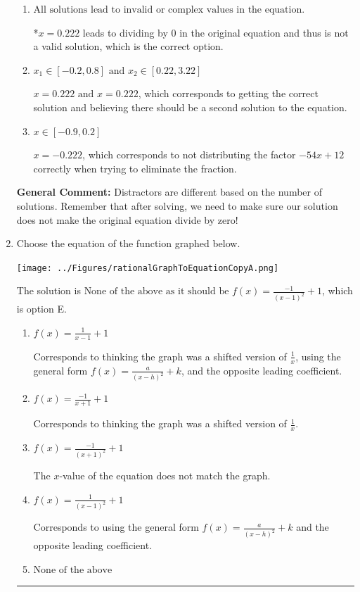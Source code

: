 \documentclass{extbook}[14pt]
\newcommand{\litem}[1]{\item #1

\rule{\textwidth}{0.4pt}}
\begin{document}
\begin{enumerate}
{\begin{enumerate}[label=\Alph*.]
$x = -0.222 \text{ and } x = 0.222$, which corresponds to getting the correct solution and believing there should be a second solution to the equation.
\item \( \text{All solutions lead to invalid or complex values in the equation.} \)

*$x = 0.222$ leads to dividing by 0 in the original equation and thus is not a valid solution, which is the correct option.
\item \( x_1 \in [-0.2, 0.8] \text{ and } x_2 \in [0.22,3.22] \)

$x = 0.222 \text{ and } x = 0.222$, which corresponds to getting the correct solution and believing there should be a second solution to the equation.
\item \( x \in [-0.9,0.2] \)

$x = -0.222$, which corresponds to not distributing the factor $-54x + 12$ correctly when trying to eliminate the fraction.
\end{enumerate}

\textbf{General Comment:} Distractors are different based on the number of solutions. Remember that after solving, we need to make sure our solution does not make the original equation divide by zero!
}
\litem{
Choose the equation of the function graphed below.

\begin{center}
    \texttt{[image: ../Figures/rationalGraphToEquationCopyA.png]}
\end{center}


The solution is \( \text{None of the above as it should be } f(x) = \frac{-1}{(x - 1)^2} + 1 \), which is option E.\begin{enumerate}[label=\Alph*.]
\item \( f(x) = \frac{1}{x - 1} + 1 \)

Corresponds to thinking the graph was a shifted version of $\frac{1}{x}$, using the general form $f(x) = \frac{a}{(x-h)^2}+k$, and the opposite leading coefficient.
\item \( f(x) = \frac{-1}{x + 1} + 1 \)

Corresponds to thinking the graph was a shifted version of $\frac{1}{x}$.
\item \( f(x) = \frac{-1}{(x + 1)^2} + 1 \)

The $x$-value of the equation does not match the graph.
\item \( f(x) = \frac{1}{(x - 1)^2} + 1 \)

Corresponds to using the general form $f(x) = \frac{a}{(x-h)^2}+k$ and the opposite leading coefficient.
\item \( \text{None of the above} \)


\end{enumerate}}
\end{enumerate}
\end{document}
